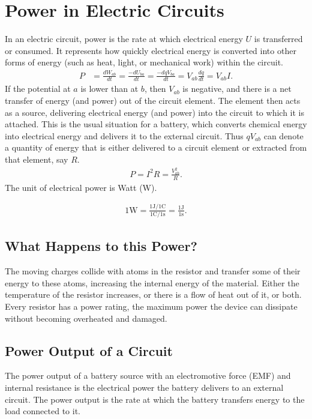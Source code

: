 \documentclass[12pt,b4paper]{article}
\begin{document}
\section{Power in Electric Circuits}
In an electric circuit, power is the rate at which electrical energy $U$ is transferred or consumed. It represents how quickly electrical energy is converted into other forms of energy (such as heat, light, or mechanical work) within the circuit.
\begin{align}
    P&=\frac{dW_{ab}}{dt}=\frac{-dU_{ba}}{dt}=\frac{-dqV_{ba}}{dt}=V_{ab}\frac{dq}{dt}=V_{ab}I.\label{power-circuit-def}
\end{align}
If the potential at $a$ is lower than at $b$, then $V_{ab}$ is negative, and there is a net transfer of energy (and power) out of the circuit element. The element then acts as a source, delivering electrical energy (and power) into the circuit to which it is attached. This is the usual situation for a battery, which converts chemical energy into electrical energy and delivers it to the external circuit. Thus $qV_{ab}$ can denote a quantity of energy that is either delivered to a circuit element or extracted from that element, say $R$.
\begin{align}
    P=I^2R=\frac{V_{ab}^2}{R}.
\end{align}
The unit of electrical power is Watt (W). 

\begin{align*}
    1\text{W}=\frac{1\text{J}/1\text{C}}{1\text{C}/1\text{s}}=\frac{1\text{J}}{1\text{s}}.
\end{align*}
\subsection*{What Happens to this Power?}
The moving charges collide with atoms in the resistor and transfer some of their energy to these atoms, increasing the internal energy of the
material. Either the temperature of the resistor increases, or there is a flow of heat out of it, or both. Every resistor has a power rating, the maximum power the device can dissipate without becoming overheated and damaged.
\subsection{Power Output of a Circuit}
The power output of a battery source with an electromotive force (EMF) and internal resistance is the electrical power the battery delivers to an external circuit. The power output is the rate at which the battery transfers energy to the load connected to it.
\end{document}
